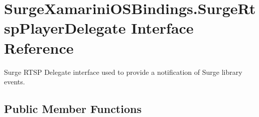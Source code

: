 \hypertarget{interface_surge_xamarini_o_s_bindings_1_1_surge_rtsp_player_delegate}{}\section{Surge\+Xamarini\+O\+S\+Bindings.\+Surge\+Rtsp\+Player\+Delegate Interface Reference}
\label{interface_surge_xamarini_o_s_bindings_1_1_surge_rtsp_player_delegate}


Surge R\+T\+SP Delegate interface used to provide a notification of Surge library events.  


\subsection*{Public Member Functions}
